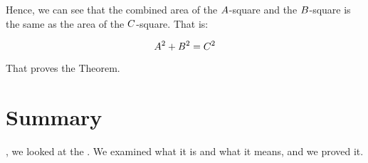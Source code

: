 \documentclass[../../../main.tex]{subfiles}
\begin{document}
Hence, we can see that the combined area of the $A$-square and the $B$-square is the same as the area of the $C$-square. That is:

\begin{equation*}
  A^{2} + B^{2} = C^{2}
\end{equation*}

That proves the Theorem.


\section{Summary}

, we looked at the . We examined what it is and what it means, and we proved it.
\end{document}
